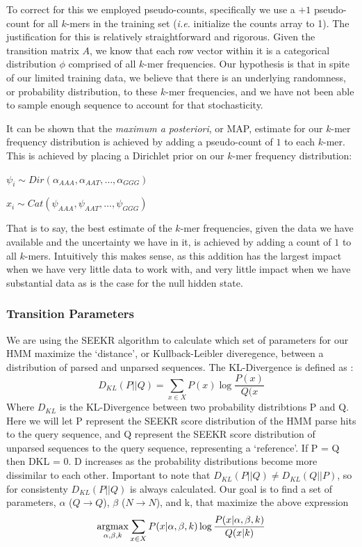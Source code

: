 To correct for this we employed pseudo-counts, specifically we use a $+1$ pseudo-count for all $k$-mers in the training set (\emph{i.e.} initialize the counts array to 1). The justification for this is relatively straightforward and rigorous. Given the transition matrix $A$, we know that each row vector within it is a categorical distribution $\phi$ comprised of all $k$-mer frequencies. Our hypothesis is that in spite of our limited training data, we believe that there is an underlying randomness, or probability distribution, to these $k$-mer frequencies, and we have not been able to sample enough sequence to account for that stochasticity. 

It can be shown that the \emph{maximum a posteriori}, or MAP, estimate for our $k$-mer frequency distribution is achieved by adding a pseudo-count of $1$ to each $k$-mer. This is achieved by placing a Dirichlet prior on our $k$-mer frequency distribution:

\begin{center}
    $\psi_i \sim Dir(\alpha_{AAA},\alpha_{AAT},\dots,\alpha_{GGG})$
    
    $x_i \sim Cat(\psi_{AAA},\psi_{AAT},\dots,\psi_{GGG})$
\end{center}

That is to say, the best estimate of the $k$-mer frequencies, given the data we have available and the uncertainty we have in it, is achieved by adding a count of $1$ to all $k$-mers. Intuitively this makes sense, as this addition has the largest impact when we have very little data to work with, and very little impact when we have substantial data as is the case for the null hidden state.

\subsubsection{Transition Parameters}

We are using the SEEKR algorithm to calculate which set of parameters for our HMM maximize the ‘distance’, or Kullback-Leibler diveregence, between a distribution of parsed and unparsed sequences.
The KL-Divergence is defined as \cite{Brookes1951FoundationsProbability}:
\begin{equation}
    D_{KL}(P||Q) = \sum_{x\in X}P(x)\log{\frac{P(x)}{Q(x}}
\end{equation}
Where $D_{KL}$ is the KL-Divergence between two probability distribtions P and Q. Here we will let P represent the SEEKR score distribution of the HMM parse hits to the query sequence, and Q represent the SEEKR score distribution of unparsed sequences to the query sequence, representing a ‘reference’. If P = Q then DKL = 0. D increases as the probability distributions become more dissimilar to each other. Important to note that $D_{KL}(P||Q) \neq D_{KL}(Q||P)$, so for consistenty $D_{KL}(P||Q)$ is always calculated.
Our goal is to find a set of parameters, $\alpha$ ($Q\rightarrow Q$), $\beta$ ($N\rightarrow N$), and k, that maximize the above expression
\begin{equation}
    \operatorname*{argmax}_{\alpha,\beta,k}\sum_{x\in X}P(x|\alpha,\beta,k)\log{\frac{P(x|\alpha,\beta,k)}{Q(x|k)}}
\end{equation}


